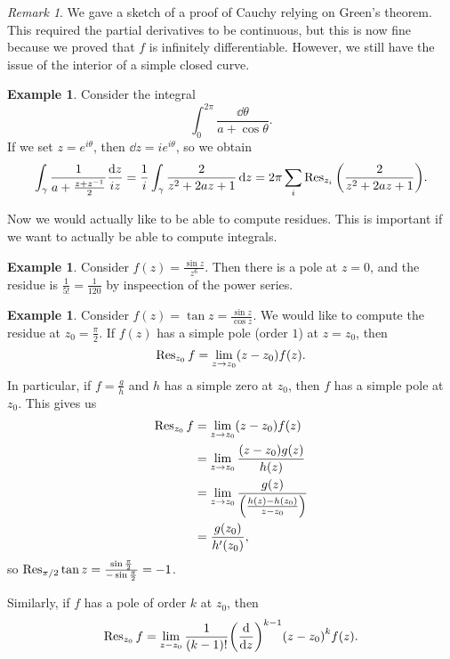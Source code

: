 \documentclass[leqno, openany]{memoir}
\theoremstyle{definition}
\newtheorem{exm}[thm]{Example}
\theoremstyle{remark}
\newtheorem{rmk}[thm]{Remark}
\theoremstyle{plain}
\theoremstyle{definition}
\theoremstyle{remark}
\begin{document}
\begin{rmk}
    We gave a sketch of a proof of Cauchy relying on Green's theorem. This required the partial derivatives to be continuous, but this is now fine because we proved that $f$ is infinitely differentiable. However, we still have the issue of the interior of a simple closed curve.
\end{rmk}

\begin{exm}
    Consider the integral
    \[ \int_0^{2 \pi} \frac{\dd{\theta}}{a + \cos \theta}. \]
    If we set $z = e^{i \theta}$, then $\dd{z} = ie^{i\theta}$, so we obtain
    \[ \int_{\gamma} \frac{1}{a + \frac{z+z^{-1}}{2}} \frac{\dd{z}}{iz} = \frac{1}{i} \int_{\gamma} \frac{2}{z^2 + 2az + 1} \dd{z} = 2 \pi \sum_{i} \Res_{z_i} \qty(\frac{2}{z^2 + 2az + 1}). \]
\end{exm}

Now we would actually like to be able to compute residues. This is important if we want to actually be able to compute integrals.

\begin{exm}
    Consider $f(z) = \frac{\sin z}{z^6}$. Then there is a pole at $z = 0$, and the residue is $\frac{1}{5!} = \frac{1}{120}$ by inspeection of the power series.
\end{exm}

\begin{exm}
    Consider $f(z) = \tan z = \frac{\sin z}{\cos z}$. We would like to compute the residue at $z_0 = \frac{\pi}{2}$. If $f(z)$ has a simple pole (order $1$) at $z = z_0$, then
    \[ \Res_{z_0} f = \lim_{z \to z_0} (z-z_0) f(z). \]
    In particular, if $f = \frac{g}{h}$ and $h$ has a simple zero at $z_0$, then $f$ has a simple pole at $z_0$. This gives us
    \begin{align*}
        \Res_{z_0} f &= \lim_{z \to z_0} (z-z_0) f(z) \\
                     &= \lim_{z \to z_0} \frac{(z-z_0)g(z)}{h(z)} \\
                     &= \lim_{z \to z_0} \frac{g(z)}{\qty(\frac{h(z)-h(z_0)}{z-z_0})} \\
                     &= \frac{g(z_0)}{h'(z_0)},
    \end{align*}
    so $\Res_{\pi/2} \tan z = \frac{\sin \frac{\pi}{2}}{-\sin \frac{\pi}{2}} = -1$.
\end{exm}

Similarly, if $f$ has a pole of order $k$ at $z_0$, then 
\[ \Res_{z_0} f = \lim_{z - z_0} \frac{1}{(k-1)!} {\qty(\dv{z})}^{k-1} {(z-z_0)}^k f(z). \]
\end{document}
